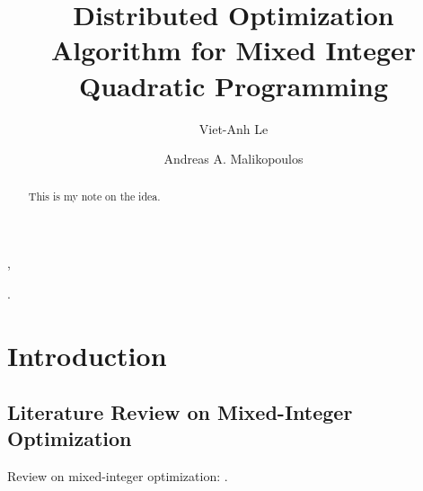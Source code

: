 \documentclass[twocolumn,amsthm]{autart}%
\theoremstyle{definition}
\theoremstyle{plain}
\begin{document}
\begin{frontmatter}
\title{Distributed Optimization Algorithm for Mixed Integer Quadratic Programming} %

\author[Paestum]{Viet-Anh Le},  %
\author[Paestum]{Andreas A. Malikopoulos}
\address[Paestum]{Department of Mechanical Engineering, University of Delaware, 126 Spencer Lab, 130 Academy Street, Newark, DE, 19716, USA}  %
\begin{keyword}                           %
.
\end{keyword}                             %


\begin{abstract}

This is my note on the idea.

\end{abstract}

\end{frontmatter}


\section{Introduction}

\subsection{Literature Review on Mixed-Integer Optimization}

Review on mixed-integer optimization: \cite[Sec. 5.2]{ioan2021mixed}.
\end{document}

